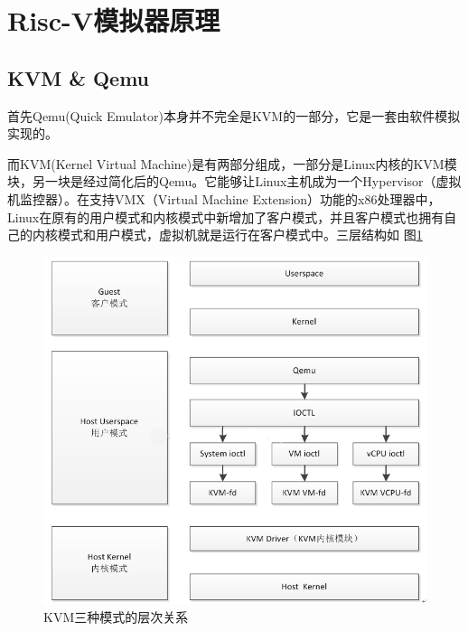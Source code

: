 \section{Risc-V模拟器原理}
\subsection{KVM \& Qemu}
首先Qemu(Quick Emulator)本身并不完全是KVM的一部分，它是一套由软件模拟实现的。

而KVM(Kernel Virtual Machine)是有两部分组成，一部分是Linux内核的KVM模块，另一块是经过简化后的Qemu。它能够让Linux主机成为一个Hypervisor（虚拟机监控器）。在支持VMX（Virtual    Machine Extension）功能的x86处理器中，Linux在原有的用户模式和内核模式中新增加了客户模式，并且客户模式也拥有自己的内核模式和用户模式，虚拟机就是运行在客户模式中。三层结构如   图\ref{fig:kvm}

\begin{figure}[htbp]
  \centering %
  \includegraphics[width=0.7 \textwidth]{figs/KVM三种模式的层次关系.png}
  \caption{KVM三种模式的层次关系}
  \label{fig:kvm} %
\end{figure}










